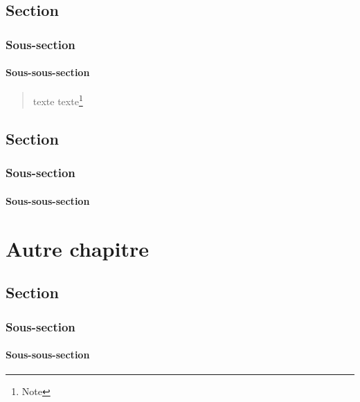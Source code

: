 \documentclass[a4paper,11pt]{book}
\begin{document}
\section{Section}
\subsection{Sous-section}
\subsubsection{Sous-sous-section}
\kant
\begin{quote}
\kant[1]
\end{quote}

\kant[1]

\newenvironment{macitation}{\begin{quote}\singlespacing\small}{\end{quote}}

\begin{macitation}
\kant[1] texte texte\footnote{Note}
\end{macitation}

\kant[1]

\section{Section}
\subsection{Sous-section}
\subsubsection{Sous-sous-section}
\kant[5]

\chapter{Autre chapitre}
\section{Section}
\subsection{Sous-section}
\subsubsection{Sous-sous-section}
\kant
\end{document}
